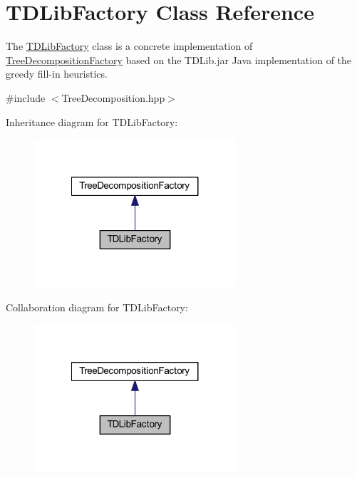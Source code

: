 \hypertarget{class_t_d_lib_factory}{}\section{T\+D\+Lib\+Factory Class Reference}
\label{class_t_d_lib_factory}


The \hyperlink{class_t_d_lib_factory}{T\+D\+Lib\+Factory} class is a concrete implementation of \hyperlink{class_tree_decomposition_factory}{Tree\+Decomposition\+Factory} based on the T\+D\+Lib.\+jar Java implementation of the greedy fill-\/in heuristics.  




{\ttfamily \#include $<$Tree\+Decomposition.\+hpp$>$}



Inheritance diagram for T\+D\+Lib\+Factory\+:\nopagebreak
\begin{figure}[H]
\begin{center}
\leavevmode
\includegraphics[width=212pt]{class_t_d_lib_factory__inherit__graph}
\end{center}
\end{figure}


Collaboration diagram for T\+D\+Lib\+Factory\+:\nopagebreak
\begin{figure}[H]
\begin{center}
\leavevmode
\includegraphics[width=212pt]{class_t_d_lib_factory__coll__graph}
\end{center}
\end{figure}
